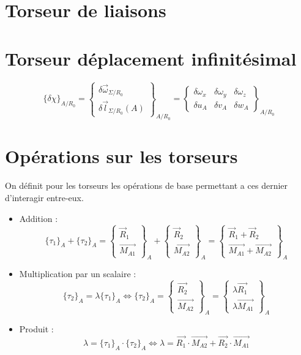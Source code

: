 \section{Torseur de liaisons}
\section{Torseur déplacement infinitésimal}
\begin{defi}

$${\lbrace\delta\chi\rbrace}_{A/R_0}=\begin{Bmatrix}\delta\overrightarrow{\omega}_{\Sigma/R_0}\\\delta\overrightarrow{l}_{\Sigma/R_0}(A)\end{Bmatrix}_{A/R_0}=\begin{Bmatrix} \delta\omega_x & \delta\omega_y  & \delta\omega_z\\ \delta u_A & \delta v_A & \delta w_A\end{Bmatrix}_{A/R_0}$$
\end{defi}
\section{Opérations sur les torseurs}
On définit pour les torseurs les opérations de base permettant a ces dernier d'interagir entre-eux.
\begin{prop}
\begin{itemize}
    \item Addition :
    $$\{\tau_1\}_A+\{\tau_2\}_A=\begin{Bmatrix}\overrightarrow{R}_1\\\overrightarrow{M_{A1}}\end{Bmatrix}_A+\begin{Bmatrix}\overrightarrow{R}_2\\\overrightarrow{M_{A2}}\end{Bmatrix}_A=\begin{Bmatrix}\overrightarrow{R}_1+\overrightarrow{R}_2\\\overrightarrow{M_{A1}}+\overrightarrow{M_{A2}}\end{Bmatrix}_A$$
    \item Multiplication par un scalaire :
    $$\{\tau_2\}_A=\lambda\{\tau_1\}_A \Leftrightarrow \{\tau_2\}_A=\begin{Bmatrix}\overrightarrow{R_2}\\\overrightarrow{M_{A2}}\end{Bmatrix}_A=\begin{Bmatrix}\lambda\overrightarrow{R_1}\\\lambda\overrightarrow{M_{A1}}\end{Bmatrix}_A$$
    \item Produit :
    $$\lambda=\{\tau_1\}_A\cdot\{\tau_2\}_A \Leftrightarrow\lambda=\overrightarrow{R_1}\cdot\overrightarrow{M_{A2}}+\overrightarrow{R_2}\cdot\overrightarrow{M_{A1}}$$
\end{itemize}
\end{prop}